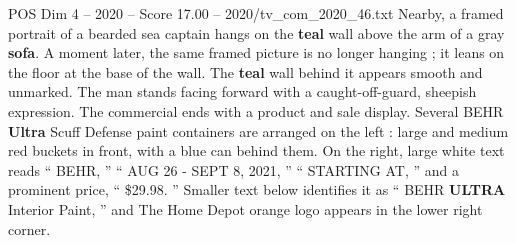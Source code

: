 \begin{textsample}{POS Dim 4 – 2020 – Score 17.00 – 2020/tv\_com\_2020\_46.txt}
Nearby, a framed portrait of a bearded sea captain hangs on the \textbf{teal} wall above the arm of a gray \textbf{sofa}.
A moment later, the same framed picture is no longer hanging ; it leans on the floor at the base of the wall.
The \textbf{teal} wall behind it appears smooth and unmarked.
The man stands facing forward with a caught-off-guard, sheepish expression.
The commercial ends with a product and sale display.
Several BEHR \textbf{Ultra} Scuff Defense paint containers are arranged on the left : large and medium red buckets in front, with a blue can behind them.
On the right, large white text reads “ BEHR, ” “ AUG 26 - SEPT 8, 2021, ” “ STARTING AT, ” and a prominent price, “ \$29.98. ” Smaller text below identifies it as “ BEHR \textbf{ULTRA} Interior Paint, ” and The Home Depot orange logo appears in the lower right corner.

\end{textsample}
